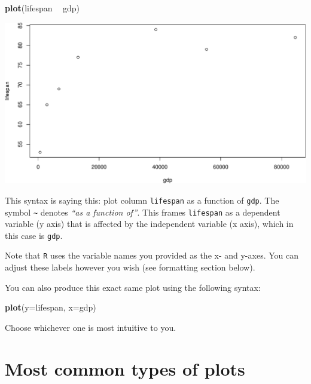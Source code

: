\documentclass[
]{book}
\newenvironment{Shaded}{\begin{snugshade}}{\end{snugshade}}
\newcommand{\DataTypeTok}[1]{\textcolor[rgb]{0.13,0.29,0.53}{#1}}
\newcommand{\KeywordTok}[1]{\textcolor[rgb]{0.13,0.29,0.53}{\textbf{#1}}}
\newcommand{\NormalTok}[1]{#1}
\newcommand{\OperatorTok}[1]{\textcolor[rgb]{0.81,0.36,0.00}{\textbf{#1}}}
\newcommand{\StringTok}[1]{\textcolor[rgb]{0.31,0.60,0.02}{#1}}
\begin{document}
\begin{Shaded}
\begin{Highlighting}[]
\KeywordTok{plot}\NormalTok{(lifespan }\OperatorTok{~}\StringTok{ }\NormalTok{gdp)}
\end{Highlighting}
\end{Shaded}

\includegraphics{figures/unnamed-chunk-96-1.pdf}

This syntax is saying this: plot column \texttt{lifespan} as a function of \texttt{gdp}. The symbol \texttt{\textasciitilde{}} denotes \emph{``as a function of''}. This frames \texttt{lifespan} as a dependent variable (y axis) that is affected by the independent variable (x axis), which in this case is \texttt{gdp}.

Note that \texttt{R} uses the variable names you provided as the x- and y-axes. You can adjust these labels however you wish (see formatting section below).

You can also produce this exact same plot using the following syntax:

\begin{Shaded}
\begin{Highlighting}[]
\KeywordTok{plot}\NormalTok{(}\DataTypeTok{y=}\NormalTok{lifespan, }\DataTypeTok{x=}\NormalTok{gdp)}
\end{Highlighting}
\end{Shaded}

Choose whichever one is most intuitive to you.

\hypertarget{most-common-types-of-plots}{%
\section*{Most common types of plots}\label{most-common-types-of-plots}}
\end{document}
